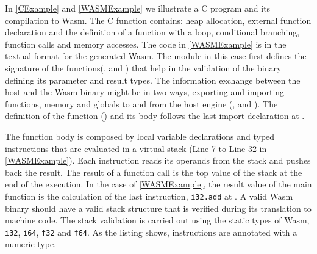 In \autoref{CExample} and \autoref{WASMExample} we illustrate a C program and its compilation to Wasm. The C function contains: heap allocation, external function declaration and the definition of a function with a loop, conditional branching, function calls and memory accesses. The code in \autoref{WASMExample} is in the textual format for the generated Wasm. The module in this case first defines the signature of the functions(,   and  )  that help in the validation of the binary defining its parameter and result types. The information exchange between the host and the Wasm binary might be in two ways, exporting and importing functions, memory and globals to and from the host engine (,  and ). The definition of the function () and its body follows the last import declaration at . 

The function body is composed by local variable declarations and typed instructions that are evaluated in a virtual stack (Line 7 to Line 32 in \autoref{WASMExample}). Each instruction reads its operands from the stack and pushes back the result. The result of a function call is the top value of the stack at the end of the execution. In the case of \autoref{WASMExample}, the result value of the main function is the calculation of the last instruction, \texttt{i32.add} at . A valid Wasm binary should have a valid stack structure that is verified during its translation to machine code. The stack validation is carried out using the static types of Wasm, \texttt{i32}, \texttt{i64}, \texttt{f32} and \texttt{f64}. As the listing shows, instructions are annotated with a numeric type.

\begin{code}
    \begin{minipage}[t]{0.4\linewidth}

\end{minipage}\hspace{10mm}
\begin{minipage}[t]{0.4\linewidth}

%

\end{minipage}






\end{code}

